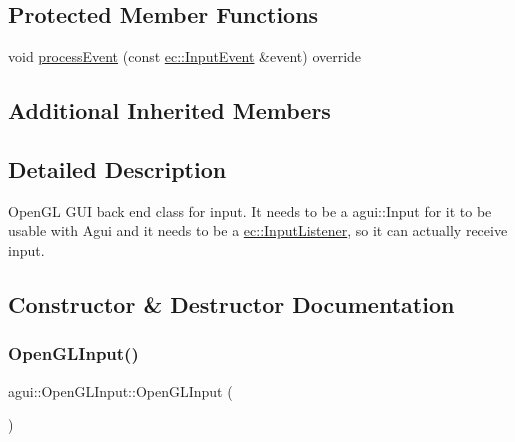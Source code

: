 \subsection*{Protected Member Functions}
\begin{DoxyCompactItemize}
\item 
void \mbox{\hyperlink{classagui_1_1_open_g_l_input_aeb8c519c7fb7791295531b12948d4390}{process\+Event}} (const \mbox{\hyperlink{structec_1_1_input_event}{ec\+::\+Input\+Event}} \&event) override
\end{DoxyCompactItemize}
\subsection*{Additional Inherited Members}


\subsection{Detailed Description}
Open\+GL G\+UI back end class for input. It needs to be a agui\+::\+Input for it to be usable with Agui and it needs to be a \mbox{\hyperlink{classec_1_1_input_listener}{ec\+::\+Input\+Listener}}, so it can actually receive input. 

\subsection{Constructor \& Destructor Documentation}
\mbox{\label{classagui_1_1_open_g_l_input_a39952038c9c55dd0096959aabdd1bcdd}} 
\subsubsection{\texorpdfstring{Open\+G\+L\+Input()}{OpenGLInput()}}
{\footnotesize\ttfamily agui\+::\+Open\+G\+L\+Input\+::\+Open\+G\+L\+Input (\begin{DoxyParamCaption}{ }\end{DoxyParamCaption})\hspace{0.3cm}{\ttfamily [explicit]}}

\mbox{\label{classagui_1_1_open_g_l_input_aea9e1ebeaad32419ad923654f96cc325}} 
